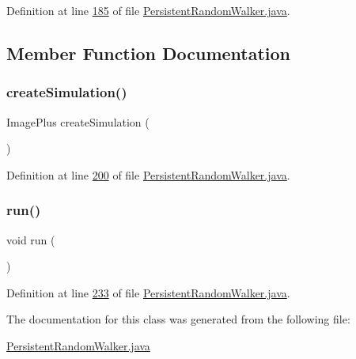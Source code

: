 Definition at line \hyperlink{_persistent_random_walker_8java_source_l00185}{185} of file \hyperlink{_persistent_random_walker_8java_source}{Persistent\+Random\+Walker.\+java}.



\subsection{Member Function Documentation}
\hypertarget{classdata_1_1_persistent_random_walker_ad015489397f3b1157e02d08913211ee4}{}\label{classdata_1_1_persistent_random_walker_ad015489397f3b1157e02d08913211ee4} 
\subsubsection{\texorpdfstring{create\+Simulation()}{createSimulation()}}
{\footnotesize\ttfamily Image\+Plus create\+Simulation (\begin{DoxyParamCaption}{ }\end{DoxyParamCaption})}



Definition at line \hyperlink{_persistent_random_walker_8java_source_l00200}{200} of file \hyperlink{_persistent_random_walker_8java_source}{Persistent\+Random\+Walker.\+java}.

\hypertarget{classdata_1_1_persistent_random_walker_a13a43e6d814de94978c515cb084873b1}{}\label{classdata_1_1_persistent_random_walker_a13a43e6d814de94978c515cb084873b1} 
\subsubsection{\texorpdfstring{run()}{run()}}
{\footnotesize\ttfamily void run (\begin{DoxyParamCaption}{ }\end{DoxyParamCaption})}



Definition at line \hyperlink{_persistent_random_walker_8java_source_l00233}{233} of file \hyperlink{_persistent_random_walker_8java_source}{Persistent\+Random\+Walker.\+java}.



The documentation for this class was generated from the following file\+:\begin{DoxyCompactItemize}
\item 
\hyperlink{_persistent_random_walker_8java}{Persistent\+Random\+Walker.\+java}\end{DoxyCompactItemize}
